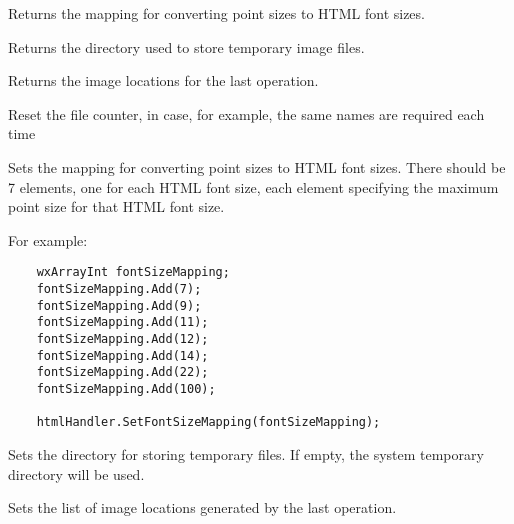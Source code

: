 
Returns the mapping for converting point sizes to HTML font sizes.

\label{wxrichtexthtmlhandlergettempdir}


Returns the directory used to store temporary image files.

\label{wxrichtexthtmlhandlergettemporaryimagelocations}


Returns the image locations for the last operation.

\label{wxrichtexthtmlhandlersetfilecounter}


Reset the file counter, in case, for example, the same names are required each time

\label{wxrichtexthtmlhandlersetfontsizemapping}


Sets the mapping for converting point sizes to HTML font sizes.
There should be 7 elements, one for each HTML font size, each element specifying the maximum point size for that
HTML font size.

For example:

\begin{verbatim}
    wxArrayInt fontSizeMapping;
    fontSizeMapping.Add(7);
    fontSizeMapping.Add(9);
    fontSizeMapping.Add(11);
    fontSizeMapping.Add(12);
    fontSizeMapping.Add(14);
    fontSizeMapping.Add(22);
    fontSizeMapping.Add(100);
    
    htmlHandler.SetFontSizeMapping(fontSizeMapping);
\end{verbatim}

\label{wxrichtexthtmlhandlersettempdir}


Sets the directory for storing temporary files. If empty, the system
temporary directory will be used.

\label{wxrichtexthtmlhandlersettemporaryimagelocations}


Sets the list of image locations generated by the last operation.

